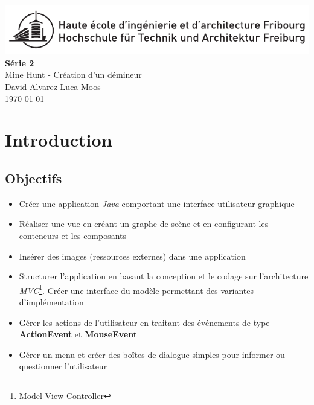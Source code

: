 \documentclass[a4paper, 10pt]{article}
\begin{document}
\begin{titlepage}
\thispagestyle{fancy} %
\begin{center}
\includegraphics[width=\textwidth]{./logonb.pdf}\\
\vspace{2.5cm}
{\Huge \textbf{Série 2}}\\%
\vspace{0.2cm}
{\huge Mine Hunt - Création d'un démineur}\\%
\vspace{0.9cm}
{\LARGE David Alvarez \hspace{2cm}Luca Moos}\\%
\vspace{0.9cm}
{\Large \today}\\
\end{center}
\vfill
\tableofcontents
\end{titlepage}
\newpage
\section{Introduction}
\subsection{Objectifs}
\begin{itemize}
\item Créer une application \emph{Java} comportant une interface utilisateur graphique
\item Réaliser une vue en créant un graphe de scène et en configurant les conteneurs et les composants
\item Insérer des images (ressources externes) dans une application
\item Structurer l'application en basant la conception et le codage sur l'architecture \emph{MVC}\footnote{Model-View-Controller}. Créer une interface du modèle permettant des variantes d'implémentation
\item Gérer les actions de l'utilisateur en traitant des événements de type \textbf{ActionEvent} et \textbf{MouseEvent}
\item Gérer un menu et créer des boîtes de dialogue simples pour informer ou questionner l'utilisateur
\end{itemize}
\end{document}
